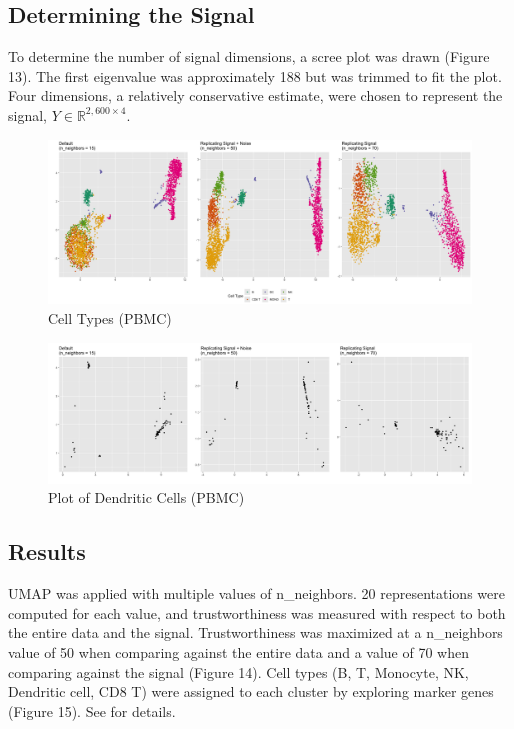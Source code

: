 \documentclass{article}
\begin{document}
\subsection{Determining the Signal}
To determine the number of signal dimensions, a scree plot was drawn (Figure 13). The first eigenvalue was approximately 188 but was trimmed to fit the plot. Four dimensions, a relatively conservative estimate, were chosen to represent the signal, $Y \in \mathbb{R}^{2,600 \times 4}$.

\renewcommand{\thefigure}{15}
\begin{figure}[t]
\includegraphics[scale=0.22]{BPCells_cell_types}
\centering
\caption{Cell Types (PBMC)}
\end{figure}

\renewcommand{\thefigure}{16}
\begin{figure}[b]
\includegraphics[scale=0.22]{DC}
\centering
\caption{Plot of Dendritic Cells (PBMC)}
\end{figure}

\subsection{Results}
UMAP was applied with multiple values of n\_neighbors. 20 representations were computed for each value, and trustworthiness was measured with respect to both the entire data and the signal. Trustworthiness was maximized at a n\_neighbors value of 50 when comparing against the entire data and a value of 70 when comparing against the signal (Figure 14). Cell types (B, T, Monocyte, NK, Dendritic cell, CD8 T) were assigned to each cluster by exploring marker genes (Figure 15). See \cite{BPCells tutorial} for details.
\end{document}

